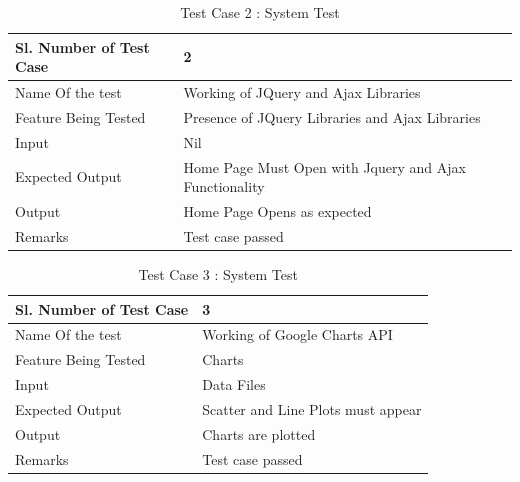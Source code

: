 \documentclass[12pt]{report}
\begin{document}
\begin{table}
    \begin{tabular}{|l|l|}
    \hline
    Sl. Number of Test Case & 2                                                      \\ \hline
    Name Of the test        & Working of JQuery and Ajax Libraries                   \\ \hline
    Feature Being Tested    & Presence of JQuery Libraries and Ajax Libraries        \\ \hline
    Input                   & Nil                                                    \\ \hline
    Expected Output         & Home Page Must Open with Jquery and Ajax Functionality \\ \hline
    Output                  & Home Page Opens as expected                            \\ \hline
    Remarks                 & Test case passed                                       \\ \hline
    \end{tabular}
    \caption {Test Case 2 : System Test}
\end{table}





\begin{table}
    \begin{tabular}{|l|l|}
    \hline
    Sl. Number of Test Case & 3                                  \\ \hline
    Name Of the test        & Working of Google Charts API       \\ \hline
    Feature Being Tested    & Charts                             \\ \hline
    Input                   & Data Files                         \\ \hline
    Expected Output         & Scatter and Line Plots must appear \\ \hline
    Output                  & Charts are plotted                 \\ \hline
    Remarks                 & Test case passed                   \\ \hline
    \end{tabular}
    \caption {Test Case 3 : System Test}
\end{table}
\end{document}
